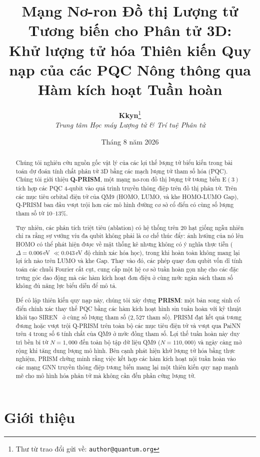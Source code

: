 \documentclass[10pt,twocolumn,letterpaper]{article}
\title{\textbf{Mạng Nơ-ron Đồ thị Lượng tử Tương biến cho Phân tử 3D:\\Khử lượng tử hóa Thiên kiến Quy nạp của các PQC Nông thông qua Hàm kích hoạt Tuần hoàn}}
\author{
    \textbf{Kkyn}\thanks{Thư từ trao đổi gửi về: \texttt{author@quantum.org}} \\
    \textit{Trung tâm Học máy Lượng tử \& Trí tuệ Phân tử}
}
\date{Tháng 8 năm 2026}
\begin{document}
\maketitle

\begin{abstract}
Chúng tôi nghiên cứu nguồn gốc vật lý của các lợi thế lượng tử biểu kiến trong bài toán dự đoán tính chất phân tử 3D bằng các mạch lượng tử tham số hóa (PQC). Chúng tôi giới thiệu \textbf{Q-PRISM}, một mạng nơ-ron đồ thị lượng tử tương biến $\mathrm{E}(3)$ tích hợp các PQC 4-qubit vào quá trình truyền thông điệp trên đồ thị phân tử. Trên các mục tiêu orbital điện tử của QM9 (HOMO, LUMO, và khe HOMO-LUMO Gap), Q-PRISM ban đầu vượt trội hơn các mô hình đường cơ sở cổ điển có cùng số lượng tham số từ $10$--$13\%$.

Tuy nhiên, các phân tích triệt tiêu (ablation) có hệ thống trên 20 hạt giống ngẫu nhiên chỉ ra rằng sự vướng víu đa qubit không phải là cơ chế thúc đẩy: ảnh hưởng của nó lên HOMO có thể phát hiện được về mặt thống kê nhưng không có ý nghĩa thực tiễn ($\Delta = 0.006$\,eV $\ll 0.043$\,eV độ chính xác hóa học), trong khi hoàn toàn không mang lại lợi ích nào trên LUMO và khe Gap. Thay vào đó, các phép quay đơn qubit vốn dĩ tính toán các chuỗi Fourier cắt cụt, cung cấp một hệ cơ sở tuần hoàn gọn nhẹ cho các đặc trưng góc dao động mà các hàm kích hoạt đơn điệu ở cùng mức ngân sách tham số không đủ năng lực biểu diễn để mô tả.

Để cô lập thiên kiến quy nạp này, chúng tôi xây dựng \textbf{PRISM}: một bản song sinh cổ điển chính xác thay thế PQC bằng các hàm kích hoạt hình sin tuần hoàn với kỹ thuật khởi tạo SIREN~\cite{sitzmann2020siren} ở cùng số lượng tham số ($2{,}527$ tham số). PRISM đạt kết quả tương đương hoặc vượt trội Q-PRISM trên toàn bộ các mục tiêu điện tử và vượt qua PaiNN trên 4 trong số 6 tính chất của QM9 ở mức đồng tham số. Lợi thế tuần hoàn này duy trì bền bỉ từ $N = 1{,}000$ đến toàn bộ tập dữ liệu QM9 ($N = 110{,}000$) và ngày càng mở rộng khi tăng dung lượng mô hình. Bên cạnh phát hiện khử lượng tử hóa bằng thực nghiệm, PRISM chứng minh rằng việc kết hợp các hàm kích hoạt nội tuần hoàn vào các mạng GNN truyền thông điệp tương biến mang lại một thiên kiến quy nạp mạnh mẽ cho mô hình hóa phân tử mà không cần đến phần cứng lượng tử.
\end{abstract}

\section{Giới thiệu}
\label{sec:intro}
\end{document}
